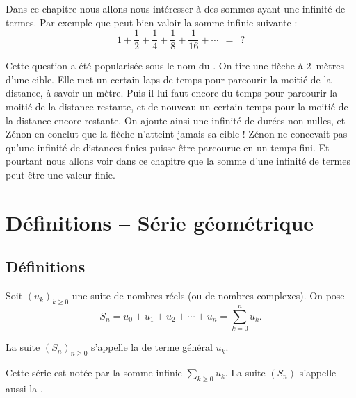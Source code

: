 \documentclass[class=report,crop=false]{standalone}
\begin{document}




Dans ce chapitre nous allons nous intéresser à des sommes ayant une infinité de termes.
Par exemple que peut bien valoir la somme infinie suivante :
\[1+\frac{1}{2} +\frac{1}{4} +\frac{1}{8}+\frac{1}{16} +\cdots \ \ = \ \ ? \]



Cette question a été
popularisée sous le nom du . 
On tire une flèche à $2$~mètres d'une cible. 
Elle met un certain laps de temps pour parcourir
la moitié de la distance, à savoir un mètre. Puis il lui faut encore du 
temps pour parcourir la moitié de la distance restante, et de nouveau un 
certain temps pour la moitié de la distance encore restante. 
On ajoute ainsi une infinité de durées non nulles, et Zénon en conclut 
que la flèche n'atteint jamais sa cible ! Zénon ne concevait pas qu'une infinité 
de distances finies puisse être parcourue en un temps fini.
Et pourtant nous allons voir dans ce chapitre que la somme d'une infinité de termes
peut être une valeur finie.



\section{Définitions -- Série géométrique}



\subsection{Définitions}

\begin{definition}
Soit $(u_k)_{k \ge 0}$ une suite de nombres réels (ou de nombres complexes).
On pose
$$S_n=u_0+u_1+u_2+\cdots+ u_n=\sum_{k=0}^n u_k.$$

La suite $(S_n)_{n \ge 0}$ s'appelle la  de terme général 
$u_k$.

Cette série est notée par la somme infinie $\displaystyle \sum_{k \ge 0} u_k $.
La suite $(S_n)$ s'appelle aussi la .
\end{definition}
\end{document}
